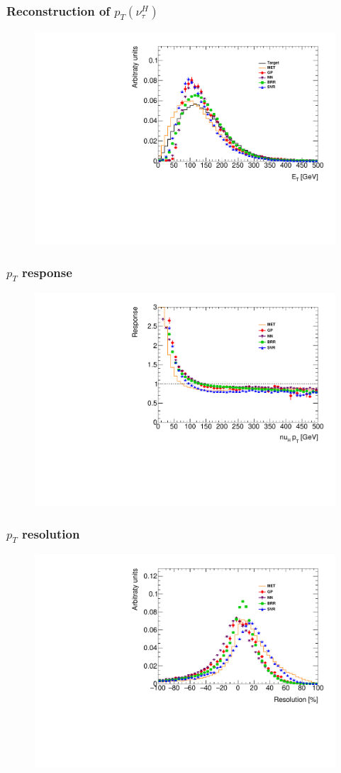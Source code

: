 \documentclass[9pt, lualatex]{beamer}
\begin{document}
\begin{frame}
    \frametitle{Reconstruction of $p_{T}(\nu_\tau^H)$}

    \begin{figure}
        \centering
        \includegraphics[width=.7\textwidth]{plots/pt.pdf}
    \end{figure}
\end{frame}

\begin{frame}
    \frametitle{$p_{T}$ response}

    \begin{figure}
        \centering
        \includegraphics[width=.7\textwidth]{plots/profile.pdf}
    \end{figure}
\end{frame}

\begin{frame}
    \frametitle{$p_{T}$ resolution}

    \begin{figure}
        \centering
        \includegraphics[width=.7\textwidth]{plots/resolution.pdf}
    \end{figure}
\end{frame}
\end{document}
